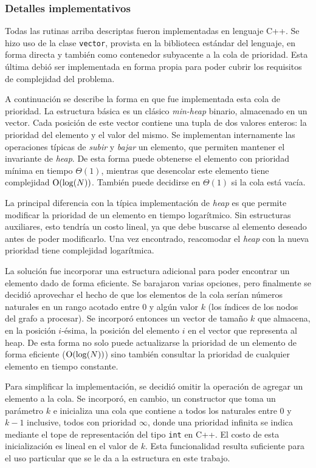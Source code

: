     \subsubsection{Detalles implementativos}
    Todas las rutinas arriba descriptas fueron implementadas en lenguaje C++.
    Se hizo uso de la clase \texttt{vector}, provista en la biblioteca
    estándar del lenguaje, en forma directa y también como contenedor
    subyacente a la cola de prioridad. Esta última debió ser implementada en
    forma propia para poder cubrir los requisitos de complejidad del problema.

    A continuación se describe la forma en que fue implementada esta cola de
    prioridad. La estructura básica es un clásico
    \emph{min-heap} binario, almacenado en un vector. Cada posición de este
    vector contiene una tupla de dos valores enteros: la prioridad del
    elemento y el valor del mismo. Se implementan internamente las
    operaciones típicas de \emph{subir} y \emph{bajar} un elemento, que
    permiten mantener el invariante de \emph{heap}. De esta forma puede
    obtenerse el elemento con prioridad mínima en tiempo $\Theta(1)$,
    mientras que desencolar este elemento tiene complejidad $\operatorname{O}(\log(N))$.
    También puede decidirse en $\Theta(1)$ si la cola está vacía.

    La principal diferencia con la típica implementación de \emph{heap} es
    que permite modificar la prioridad de un elemento en tiempo
    logarítmico. Sin estructuras auxiliares, esto tendría un costo lineal, ya
    que debe buscarse al elemento deseado antes de poder modificarlo. Una vez
    encontrado, reacomodar el \emph{heap} con la nueva prioridad tiene
    complejidad logarítmica.

    La solución fue incorporar una estructura adicional para poder encontrar
    un elemento dado de forma eficiente. Se barajaron varias opciones, pero
    finalmente se decidió aprovechar el hecho de que los elementos de la cola
    serían números naturales en un rango acotado entre $0$ y algún valor $k$
    (los índices de los nodos del grafo a procesar). Se incorporó entonces un
    vector de tamaño $k$ que almacena, en la posición $i$-ésima, la posición
    del elemento $i$ en el vector que representa al heap. De esta forma no
    solo puede actualizarse la prioridad de un elemento de forma eficiente
    ($\operatorname{O}(\log(N))$) sino también consultar la prioridad de cualquier
    elemento en tiempo constante.

    Para simplificar la implementación, se decidió omitir la operación de
    agregar un elemento a la cola. Se incorporó, en cambio, un constructor que
    toma un parámetro $k$ e inicializa una cola que contiene a todos los
    naturales entre $0$ y $k-1$ inclusive, todos con prioridad $\infty$,
    donde una prioridad infinita se indica mediante el tope de representación
    del tipo \texttt{int} en C++. El costo de esta inicialización es lineal
    en el valor de $k$. Esta funcionalidad resulta suficiente para
    el uso particular que se le da a la estructura en este trabajo.


